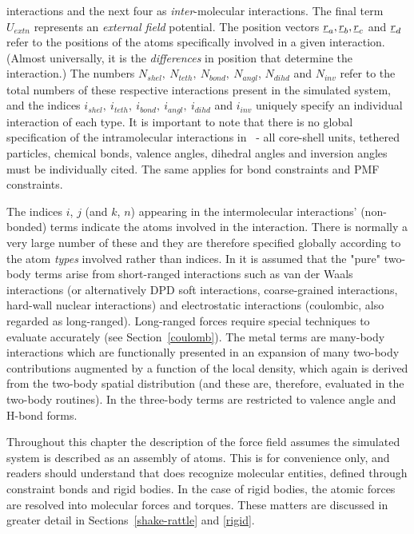 interactions and the next four as {\em inter}-molecular
interactions.  The final term $U_{extn}$ represents an {\em
external field} potential.
The position vectors $\mbox{$\underline{r}$}_{a},\mbox{$\underline{r}$}_{b},\mbox{$\underline{r}$}_{c}$ and $\mbox{$\underline{r}$}_{d}$
refer to the positions of the atoms specifically involved in a given
interaction. (Almost universally, it is the {\em differences} in
position that determine the interaction.)  The numbers
$N_{shel},~N_{teth},~N_{bond},~N_{angl}$, $N_{dihd}$ and $N_{inv}$
refer to the total numbers of these respective interactions present
in the simulated system, and the indices
$i_{shel},~i_{teth},~i_{bond},~i_{angl},~i_{dihd}$ and $i_{inv}$
uniquely specify an individual interaction of each type.  It is
important to note that there is no global specification of the
intramolecular interactions in \D~- all core-shell units, tethered
particles, chemical bonds, valence angles, dihedral angles and
inversion angles must be individually cited.  The same applies for
bond constraints and PMF
constraints.

The indices $i$, $j$ (and $k$, $n$) appearing in the intermolecular
interactions' (non-bonded) terms
indicate the atoms involved in the interaction.
There is normally a very large number of these and they are
therefore specified globally according to the atom {\em types}
involved rather than indices.  In \D it is assumed that the "pure"
two-body terms arise from short-ranged interactions such as van der
Waals interactions (or alternatively
DPD soft interactions, coarse-grained interactions, hard-wall
nuclear interactions) and electrostatic interactions (coulombic,
also regarded as long-ranged).
Long-ranged forces require special techniques to evaluate accurately
(see Section~\ref{coulomb}).  The metal terms are
many-body interactions which are functionally presented in an expansion of
many two-body contributions augmented by a function of the local density,
which again is derived from the two-body spatial distribution
(and these are, therefore, evaluated in the two-body
routines).  In \D the three-body terms
are restricted to valence angle and
H-bond forms.

Throughout this chapter the description of the force
field assumes the simulated system is described
as an assembly of atoms.  This is for convenience only, and
readers should understand that \D does recognize molecular
entities, defined through constraint bonds
and rigid bodies.  In the case of rigid bodies, the atomic forces
are resolved into molecular forces and torques.  These matters are
discussed in greater detail in Sections~\ref{shake-rattle} and \ref{rigid}.

